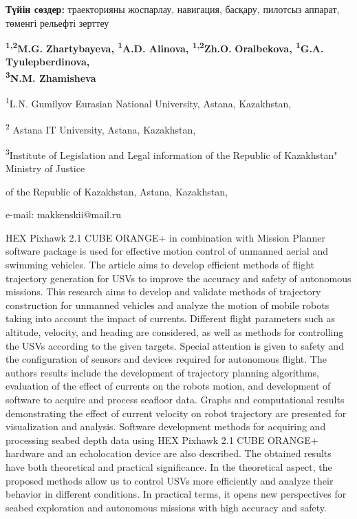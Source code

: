 {\bfseries Түйін сөздер:} траекторияны жоспарлау, навигация, басқару,
пилотсыз аппарат, төменгі рельефті зерттеу


\begin{center}
{\bfseries \textsuperscript{1,2}M.G.}
{\bfseries Zhartybayeva\envelope, \textsuperscript{1}A.D.
Alinova, \textsuperscript{1,2}Zh.O.} {\bfseries Oralbekova,
\textsuperscript{1}G.A.} {\bfseries Tyulepberdinova,\\
\textsuperscript{3}N.M. Zhamisheva}

\textsuperscript{1}L.N. Gumilyov Eurasian National University, Astana,
Kazakhstan,

\textsuperscript{2} Astana IT University, Astana, Kazakhstan,

\textsuperscript{3}Institute of Legislation and Legal information of the
Republic of Kazakhstan" Ministry of Justice

of the Republic of Kazakhstan, Astana, Kazakhstan,

e-mail: makkenskii@mail.ru
\end{center}

HEX Pixhawk 2.1 CUBE ORANGE+ in combination with Mission Planner
software package is used for effective motion control of unmanned aerial
and swimming vehicles. The article aims to develop efficient methods of
flight trajectory generation for USVs to improve the accuracy and safety
of autonomous missions. This research aims to develop and validate
methods of trajectory construction for unmanned vehicles and analyze the
motion of mobile robots taking into account the impact of currents.
Different flight parameters such as altitude, velocity, and heading are
considered, as well as methods for controlling the USVs according to the
given targets. Special attention is given to safety and the
configuration of sensors and devices required for autonomous flight. The
author\textquotesingle s results include the development of trajectory
planning algorithms, evaluation of the effect of currents on the
robot\textquotesingle s motion, and development of software to acquire
and process seafloor data. Graphs and computational results
demonstrating the effect of current velocity on robot trajectory are
presented for visualization and analysis. Software development methods
for acquiring and processing seabed depth data using HEX Pixhawk 2.1
CUBE ORANGE+ hardware and an echolocation device are also described. The
obtained results have both theoretical and practical significance. In
the theoretical aspect, the proposed methods allow us to control USVs
more efficiently and analyze their behavior in different conditions. In
practical terms, it opens new perspectives for seabed exploration and
autonomous missions with high accuracy and safety.

